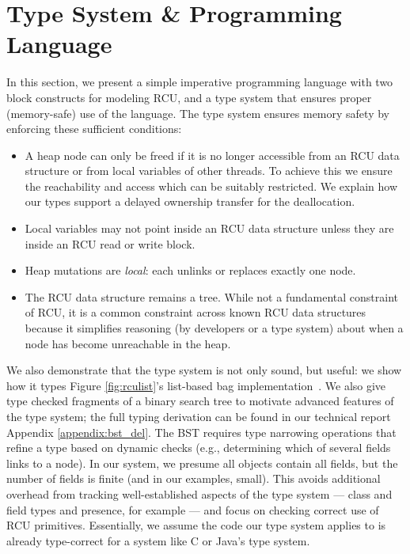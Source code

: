 \makeatletter %
\def\arcr{\@arraycr}
\makeatother
\section{Type System \& Programming Language}
\label{sec:tslbl}
In this section, we present a simple imperative programming language with two block constructs for modeling \textsf{RCU}, and a type system that ensures proper (memory-safe) use of the language.
The type system ensures memory safety by enforcing these sufficient conditions:
\begin{itemize}
\item A heap node can only be freed if it is no longer accessible from an RCU data structure or from local variables of other threads. To achieve this we ensure the reachability and access which can be suitably restricted. We explain how our types support a delayed ownership transfer for the deallocation.
\item Local variables may not point inside an RCU data structure unless they are inside an \textsf{RCU} read or write block.
\item Heap mutations are \textit{local}: each unlinks or replaces exactly one node.
\item The RCU data structure remains a tree.  While not a fundamental constraint of RCU, it is a common constraint across known RCU data structures because it simplifies reasoning (by developers or a type system) about when a node has become unreachable in the heap.
\end{itemize}

We also demonstrate that the type system is not only sound, but useful:
we show how it types Figure \ref{fig:rculist}'s list-based bag implementation~\cite{McKenney2015SomeEO}.
We also give type checked fragments of a binary search tree to motivate advanced features of the type system; the full typing derivation can be found in our technical report~\cite{isotek} Appendix \ref{appendix:bst_del}. The BST requires type narrowing operations that refine a type based on dynamic checks (e.g., determining which of several fields links to a node).
In our system, we presume all objects contain all fields, but the number of fields is finite (and in our examples, small). This avoids additional overhead from tracking well-established aspects of the type system --- class and field types and presence, for example --- and focus on checking correct use of RCU primitives.  Essentially, we assume the code our type system applies to is already type-correct for a system like C or Java's type system.
